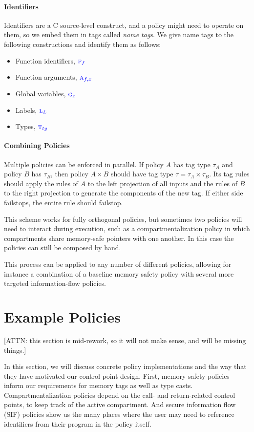 \documentclass{llncs}
\begin{document}
\paragraph*{Identifiers}

Identifiers are a C source-level construct, and a policy might need to operate on them,
so we embed them in tags called {\em name tags}. We give name tags to the
following constructions and identify them as follows:
\begin{itemize}
\item Function identifiers, \({\color{blue} \textnormal{\sc f}_{f}}\)
\item Function arguments, \({\color{blue} \textnormal{\sc a}_{f,x}}\)
\item Global variables, \({\color{blue} \textnormal{\sc g}_{x}}\)
\item Labels, \({\color{blue} \textnormal{\sc l}_{L}}\)
\item Types, \({\color{blue} \textnormal{\sc t}_{ty}}\)
\end{itemize}

\paragraph*{Combining Policies}

Multiple policies can be enforced in parallel. If policy \(A\) has tag type \(\tau_A\)
and policy \(B\) has \(\tau_B\), then policy \(A \times B\) should have tag type
\(\tau = \tau_A \times \tau_B\). Its tag rules should apply the rules of \(A\) to
the left projection of all inputs and the rules of \(B\) to the right projection
to generate the components of the new tag. If either side failstops, the entire
rule should failstop.

This scheme works for fully orthogonal policies, but sometimes two policies will
need to interact during execution, such as a compartmentalization policy in which
compartments share memory-safe pointers with one another. In this case the policies
can still be composed by hand.

This process can be applied to any number of different policies, allowing for instance
a combination of a baseline memory safety policy with several more targeted
information-flow policies.

\section{Example Policies}
\label{sec:policies}

[ATTN: this section is mid-rework, so it will not make sense, and will be missing things.]

In this section, we will discuss concrete policy implementations and the way
that they have motivated our control point design. First, memory safety policies
inform our requirements for memory tags as well as type casts. Compartmentalization
policies depend on the call- and return-related control points, to keep track of the
active compartment. And secure information flow (SIF) policies show us the many places
where the user may need to reference identifiers from their program in the policy itself.
\end{document}
